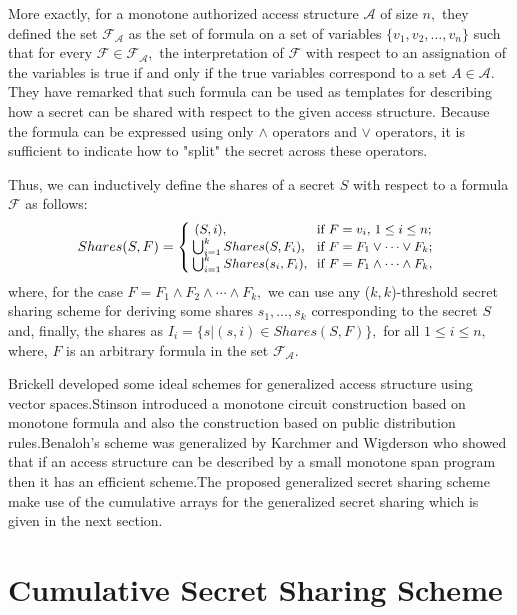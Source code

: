 \documentclass{llncs}
\begin{document}
More exactly, for a monotone authorized access structure $\mathcal{A}$ of size $n,$ they defined the set $\mathcal{F_A}$ as the set of formula on a set of variables $\{v_1,v_2,\ldots,v_n\}$ such that for every $\mathcal{F} \in \mathcal{F_A},$ the interpretation of $\mathcal{F}$ with respect to an assignation of the variables is true if and only if the true variables correspond to a set $A \in \mathcal{A.}$ They have remarked that such formula can be used as templates for describing how a secret can be shared with respect to the given access structure. Because the formula can be expressed using only $\wedge$ operators and $\vee$ operators, it is sufficient to indicate how to "split" the secret across these operators.

Thus, we can inductively define the shares of a secret $S$ with respect to a formula $\mathcal{F}$ as follows:
\begin{equation}
\small
Shares(S, F) = \left\{\!\! \begin{array}{ll}
\,(S, i), & \mbox{\!\!if $F = v_i,\, 1 \leq i \leq n;$} \\
\bigcup_{i=1}^{k} Shares(S, F_i), & \mbox{\!\!if $F = F_1\vee  \cdots\vee F_k;$} \\
\bigcup_{i=1}^{k} Shares(s_i, F_i), & \mbox{\!\!if $F = F_1\wedge \cdots\wedge F_k,$}
\end{array}
\right. \nonumber
\end{equation}
where, for the case $F = F_1\wedge F_2 \wedge \cdots\wedge F_k,$ we can use any ($k, k$)-threshold secret sharing scheme for deriving some shares $s_1,\ldots, s_k$ corresponding to the secret $S$ and, finally, the shares as $I_i = \{s|(s,i) \in Shares(S,F)\},$ for all \mbox{$1 \leq i \leq n,$} where, $F$ is an arbitrary formula in the set $\mathcal{F_A}.$

Brickell \cite{brickell1991classification}developed some ideal schemes for generalized access structure using vector spaces.Stinson \cite{stinson1992explication} introduced a monotone circuit construction based on monotone formula and also the construction based on public distribution rules.Benaloh's scheme was generalized by Karchmer and Wigderson \cite{karchmer1993span}who showed that if an access structure can be described by a small monotone span program then it has an efficient scheme.The proposed generalized secret sharing scheme make use of the cumulative arrays for the generalized secret sharing which is given in the next section.

\section {Cumulative Secret Sharing Scheme}
      
\end{document}
